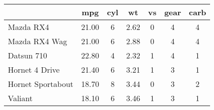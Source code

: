 \begin{tabular}{lcccccc}
\hline
\textbf{} & \textbf{mpg} & \textbf{cyl} & \textbf{wt} & \textbf{vs} & \textbf{gear} & \textbf{carb} \\
\hline
Mazda RX4 & 21.00 & 6 & 2.62 & 0 & 4 & 4\\
Mazda RX4 Wag & 21.00 & 6 & 2.88 & 0 & 4 & 4\\
Datsun 710 & 22.80 & 4 & 2.32 & 1 & 4 & 1\\
Hornet 4 Drive & 21.40 & 6 & 3.21 & 1 & 3 & 1\\
Hornet Sportabout & 18.70 & 8 & 3.44 & 0 & 3 & 2\\
Valiant & 18.10 & 6 & 3.46 & 1 & 3 & 1\\
\hline
\end{tabular}
